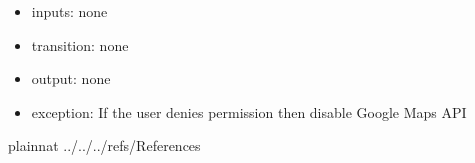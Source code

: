 \documentclass[12pt, titlepage]{article}
\begin{document}
\begin{itemize}
\item inputs: none
\item transition: none
\item output: none
\item exception: If the user denies permission then disable Google Maps API 
\end{itemize}




\newpage

 {plainnat}
 {../../../refs/References}



\end{document}
